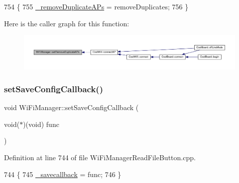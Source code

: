 \begin{DoxyCode}
754                                                                 \{
755   \hyperlink{class_wi_fi_manager_a94d25bd8d02bbf0236d75dfd8ee682d7}{\_removeDuplicateAPs} = removeDuplicates;
756 \}
\end{DoxyCode}
Here is the caller graph for this function\+:
\nopagebreak
\begin{figure}[H]
\begin{center}
\leavevmode
\includegraphics[width=350pt]{d4/dc8/class_wi_fi_manager_a4dd1dbf4f22900f226a3897b88155212_icgraph}
\end{center}
\end{figure}
\mbox{\label{class_wi_fi_manager_a3666ca145de5e28d943db54fcb204e65}} 
\subsubsection{\texorpdfstring{set\+Save\+Config\+Callback()}{setSaveConfigCallback()}}
{\footnotesize\ttfamily void Wi\+Fi\+Manager\+::set\+Save\+Config\+Callback (\begin{DoxyParamCaption}\item[{void($\ast$)(void)}]{func }\end{DoxyParamCaption})}



Definition at line 744 of file Wi\+Fi\+Manager\+Read\+File\+Button.\+cpp.


\begin{DoxyCode}
744                                                             \{
745   \hyperlink{class_wi_fi_manager_a9a316060184788e33e71d88101cb2e0d}{\_savecallback} = func;
746 \}
\end{DoxyCode}
\mbox{\label{class_wi_fi_manager_a124d89536d0ba5b5bd117e6c44a53e8d}} 
